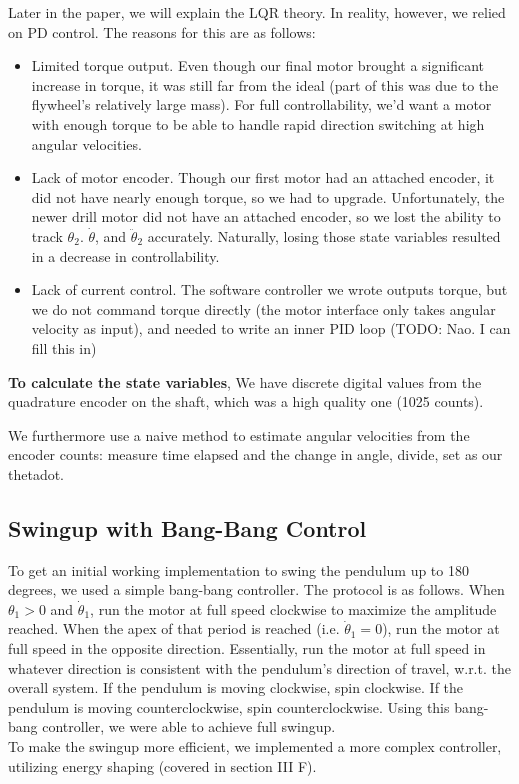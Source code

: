 \documentclass[conference]{IEEEtran}
\begin{document}
Later in the paper, we will explain the LQR theory. In reality, however, we relied on PD
control. The reasons for this are as follows:
\begin{itemize}
    \item Limited torque output. Even though our final motor brought a significant increase in torque, it was still far from the ideal (part of this was due to the flywheel's relatively large mass). For full controllability, we'd want a motor with enough torque to be able to handle rapid direction switching at high angular velocities.
    \item Lack of motor encoder. Though our first motor had an attached encoder, it did not have nearly enough torque, so we had to upgrade. Unfortunately, the newer drill motor did not have an attached encoder, so we lost the ability to track $\theta_2$. $\dot{\theta}$, and $\ddot{\theta}_2$ accurately. Naturally, losing those state variables resulted in a decrease in controllability. 
    \item Lack of current control. The software controller we wrote outputs torque, but
    we do not command torque directly (the motor interface only takes angular velocity as input), and needed to write an inner PID loop  (TODO: Nao. I
    can fill this in)
\end{itemize}


\textbf{To calculate the state variables}, 
We have discrete digital values from the quadrature encoder on the shaft, which
was a high quality one (1025 counts).

We furthermore use a naive method to estimate angular velocities from the
encoder counts: measure time elapsed and the change in angle, divide, set as our
thetadot.  

\subsection{Swingup with Bang-Bang Control}
To get an initial working implementation to swing the pendulum up to 180 degrees, we used a simple bang-bang controller. The protocol is as follows. When $\theta_1 > 0$ and $\dot{\theta}_1$, run the motor at full speed clockwise to maximize the amplitude reached. When the apex of that period is reached (i.e. $\dot{\theta}_1 = 0$), run the motor at full speed in the opposite direction. Essentially, run the motor at full speed in whatever direction is consistent with the pendulum's direction of travel, w.r.t. the overall system. If the pendulum is moving clockwise, spin clockwise. If the pendulum is moving counterclockwise, spin counterclockwise. Using this bang-bang controller, we were able to achieve full swingup.\\ \indent
To make the swingup more efficient, we implemented a more complex controller, utilizing energy shaping (covered in section III F).
\end{document}
